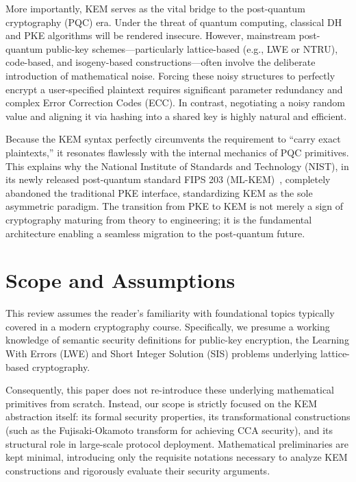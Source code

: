 More importantly, KEM serves as the vital bridge to the post-quantum cryptography (PQC) era. Under the threat of quantum computing, classical DH and PKE algorithms will be rendered insecure. However, mainstream post-quantum public-key schemes---particularly lattice-based (e.g., LWE or NTRU), code-based, and isogeny-based constructions---often involve the deliberate introduction of mathematical noise. Forcing these noisy structures to perfectly encrypt a user-specified plaintext requires significant parameter redundancy and complex Error Correction Codes (ECC). In contrast, negotiating a noisy random value and aligning it via hashing into a shared key is highly natural and efficient.

Because the KEM syntax perfectly circumvents the requirement to ``carry exact plaintexts,'' it resonates flawlessly with the internal mechanics of PQC primitives. This explains why the National Institute of Standards and Technology (NIST), in its newly released post-quantum standard FIPS 203 (ML-KEM)~\cite{nist2024fips203}, completely abandoned the traditional PKE interface, standardizing KEM as the sole asymmetric paradigm. The transition from PKE to KEM is not merely a sign of cryptography maturing from theory to engineering; it is the fundamental architecture enabling a seamless migration to the post-quantum future.

\section{Scope and Assumptions}

This review assumes the reader's familiarity with foundational topics typically covered in a modern cryptography course. Specifically, we presume a working knowledge of semantic security definitions for public-key encryption, the Learning With Errors (LWE) and Short Integer Solution (SIS) problems underlying lattice-based cryptography.

Consequently, this paper does not re-introduce these underlying mathematical primitives from scratch. Instead, our scope is strictly focused on the KEM abstraction itself: its formal security properties, its transformational constructions (such as the Fujisaki-Okamoto transform for achieving CCA security), and its structural role in large-scale protocol deployment. Mathematical preliminaries are kept minimal, introducing only the requisite notations necessary to analyze KEM constructions and rigorously evaluate their security arguments.
